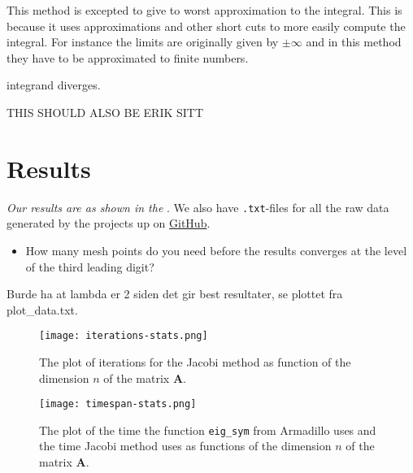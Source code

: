 \documentclass{article}
\begin{document}
This method is excepted to give to worst approximation to the integral. This is because it uses approximations and other short cuts to more easily compute the integral. For instance the limits are originally given by $\pm \infty$ and in this method they have to be approximated to finite numbers.

integrand diverges.

THIS SHOULD ALSO BE ERIK SITT

\vspace{1cm}

\section{Results} \label{sec:Results}

  \textit{Our results are as shown in the }. We also have \texttt{.txt}-files for all the raw data generated by the projects up on \href{https://github.com/Erikbgram/Fys3150}{GitHub}. \\

\begin{itemize}

  \item How many mesh points do you need before the results converges at the level of the third leading digit?

\end{itemize}

  Burde ha at lambda er 2 siden det gir best resultater, se plottet fra plot\_data.txt.


\iffalse

  \begin{figure}[ht]
  	\centering
    \texttt{[image: iterations-stats.png]}
  	\caption{The plot of iterations for the Jacobi method as function of the dimension $n$ of the matrix \textbf{A}. }
    \label{fig:iterationspng}
  \end{figure}

  \begin{figure}[ht]
    \centering
    \texttt{[image: timespan-stats.png]}
    \caption{The plot of the time the function \texttt{eig\_sym} from Armadillo uses and the time Jacobi method uses as functions of the dimension $n$ of the matrix \textbf{A}. }
    \label{fig:timespanpng}
  \end{figure}
\end{document}
